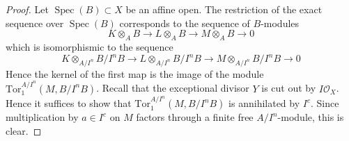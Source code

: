 \documentclass[10pt,a4paper]{amsart}
\theoremstyle{plain}
\theoremstyle{definition}
\theoremstyle{remark}
\numberwithin{equation}{subsection}
\def\Spec{\mathop{\mathrm{Spec}}}
\begin{document}
\begin{proof}
Let $\Spec(B) \subset X$ be an affine open. The restriction of the exact
sequence over $\Spec(B)$ corresponds to the sequence of $B$-modules
$$
K \otimes_A B \to L \otimes_A B \to M \otimes_A B \to 0
$$
which is isomorphismic to the sequence
$$
K \otimes_{A/I^n} B/I^nB \to
L \otimes_{A/I^n} B/I^nB \to
M \otimes_{A/I^n} B/I^nB \to 0
$$
Hence the kernel of the first map is the image of the module
$\text{Tor}_1^{A/I^n}(M, B/I^nB)$. Recall that the exceptional
divisor $Y$ is cut out by $I\mathcal{O}_X$. 
Hence it suffices to show that
$\text{Tor}_1^{A/I^n}(M, B/I^nB)$ is annihilated by $I^c$. Since
multiplication by $a \in I^c$ on $M$ factors through a finite
free $A/I^n$-module, this is clear.
\end{proof}
\end{document}
